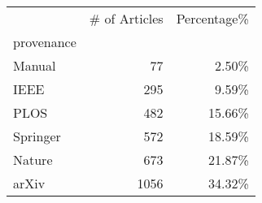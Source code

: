 \begin{tabular}{lrr}
\toprule
{} &  \# of Articles &  Percentage\%\\
provenance &                &            \\
\midrule
Manual     &             77 &        2.50\%\\
IEEE       &            295 &        9.59\%\\
PLOS       &            482 &       15.66\%\\
Springer   &            572 &       18.59\%\\
Nature     &            673 &       21.87\%\\
arXiv      &           1056 &       34.32\%\\
\bottomrule
\end{tabular}

